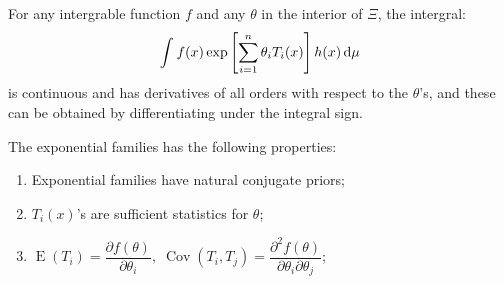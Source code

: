 \begin{theorem}\label{theo:ExponentialFamilyDiff}
	For any intergrable function $f$ and any $\theta$ in the interior of $\Xi$, the intergral:
	\begin{equation*}
		\int_{}^{}f(x)\exp\left[\sum_{i=1}^{n}\theta_iT_i(x)\right]h(x)\mathop{}\!\mathrm{d}\mu
	\end{equation*}
	is continuous and has derivatives of all orders with respect to the $\theta$'s, and these can be obtained by differentiating under the integral sign.
\end{theorem}
\begin{property}
	The exponential families has the following properties:
	\begin{enumerate}
		\item Exponential families have natural conjugate priors;
		\item $T_i(x)$'s are sufficient statistics for $\theta$;
		\item $\operatorname{E}(T_i)=\dfrac{\partial f(\theta)}{\partial\theta_i},\;\operatorname{Cov}(T_i,T_j)=\dfrac{\partial^2f(\theta)}{\partial\theta_i\partial\theta_j}$;
	\end{enumerate}
\end{property}
